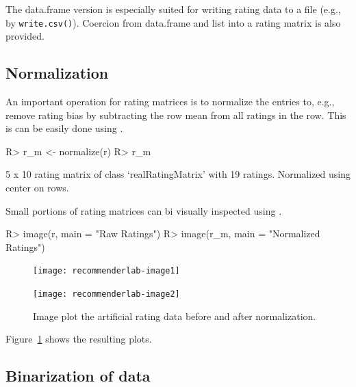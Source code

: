 \documentclass[nojss]{jss}
\newcommand{\func}[1]{\mbox{\texttt{#1()}}}
\begin{document}
The data.frame version is especially suited for writing rating data to a
file (e.g., by \func{write.csv}). 
Coercion from data.frame and list into a rating matrix is also provided.

\subsection{Normalization}
An important operation for rating matrices is to normalize the entries
to, e.g., remove rating bias by subtracting the row mean from
all ratings in the row. This is can be easily done using
.

\begin{Schunk}
\begin{Sinput}
R> r_m <- normalize(r)
R> r_m
\end{Sinput}
\begin{Soutput}
5 x 10 rating matrix of class ‘realRatingMatrix’ with 19 ratings.
Normalized using center on rows.
\end{Soutput}
\end{Schunk}

Small portions of rating matrices can bi visually inspected using 
.

\begin{Schunk}
\begin{Sinput}
R> image(r, main = "Raw Ratings")
R> image(r_m, main = "Normalized Ratings")
\end{Sinput}
\end{Schunk}


\begin{figure}
\begin{minipage}[b]{.48\linewidth}
\centerline{\texttt{[image: recommenderlab-image1]}}
\end{minipage}
\begin{minipage}[b]{.48\linewidth}
\centerline{\texttt{[image: recommenderlab-image2]}}
\end{minipage}
\caption{Image plot 
the artificial rating data before and after normalization.}
\label{fig:image1}
\end{figure}


Figure~\ref{fig:image1} shows the resulting plots.

\subsection{Binarization of data}
\end{document}
